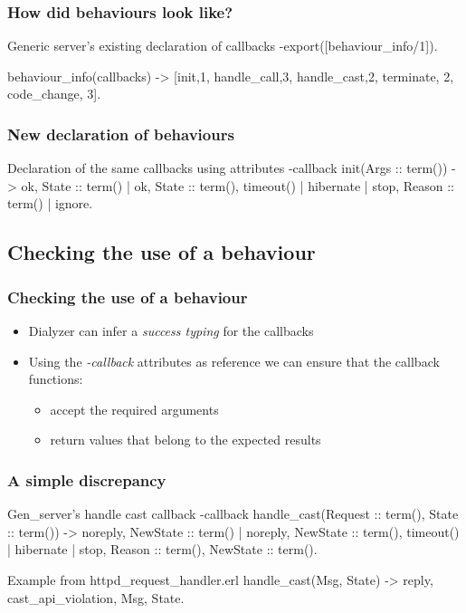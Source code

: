 \documentclass{beamer}
\begin{document}
\begin{frame}[fragile]
  \frametitle{How did behaviours look like?}
\begin{code}{Generic server's existing declaration of callbacks}
-export([behaviour_info/1]).

behaviour_info(callbacks) ->
  [{init,1}, {handle_call,3}, {handle_cast,2},
   {terminate, 2}, {code_change, 3}].

\end{code}
\end{frame}

\begin{frame}[fragile]
  \frametitle{New declaration of behaviours}
\begin{code}{Declaration of the same callbacks using attributes}
-callback init(Args :: term()) ->
    {ok, State :: term()} |
    {ok, State :: term(), timeout() | hibernate} |
    {stop, Reason :: term()} | 
    ignore.

\end{code}
\end{frame}

\subsection{Checking the use of a behaviour}

\begin{frame}
  \frametitle{Checking the use of a behaviour}
  \begin{itemize}
    \item Dialyzer can infer a \emph{success typing} for the callbacks
      \pause
    \item Using the \emph{-callback} attributes as reference we can
      ensure that the callback functions:
      \begin{itemize}
        \item accept the required arguments \pause
        \item return values that belong to the expected results
      \end{itemize}
  \end{itemize}
\end{frame}

\begin{frame}[fragile]
  \frametitle{A simple discrepancy}
\begin{code}{Gen\_server's handle cast callback}
-callback handle_cast(Request :: term(),
                      State :: term()) ->
  {noreply, NewState :: term()} | 
  {noreply, NewState :: term(), timeout() | hibernate} | 
  {stop, Reason :: term(), NewState :: term()}.
\end{code}
\begin{code}{Example from httpd\_request\_handler.erl}
handle_cast(Msg, State) ->
    {reply, {cast_api_violation, Msg}, State}.
\end{code}
\end{frame}
\end{document}
